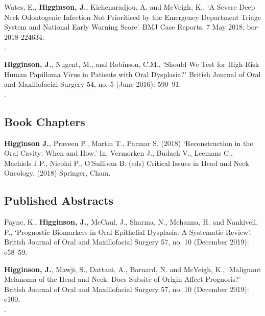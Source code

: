  Wates, E., \textbf{Higginson, J.}, Kichenaradjou, A. and McVeigh, K., `A Severe Deep Neck Odontogenic Infection Not Prioritised by the Emergency Department Triage System and National Early Warning Score’. BMJ Case Reports, 7 May 2018, bcr-2018-224634. 
\\.

\vspace{0.1cm}

 \textbf{Higginson, J.}, Nugent, M., and Robinson, C.M., `Should We Test for High-Risk Human Papilloma Virus in Patients with Oral Dysplasia?’ British Journal of Oral and Maxillofacial Surgery 54, no. 5 (June 2016): 590–91. 
\\.



\subsection*{Book Chapters}

 \textbf{Higginson J.}, Praveen P., Martin T., Parmar S. (2018) `Reconstruction in the Oral Cavity: When and How.' In: Vermorken J., Budach V., Leemans C., Machiels J.P., Nicolai P., O'Sullivan B. (eds) Critical Issues in Head and Neck Oncology. (2018) Springer, Cham. 
\\



\subsection*{Published Abstracts}

 Payne, K., \textbf{Higginson, J.}, McCaul, J., Sharma, N., Mehanna, H. and Nankivell, P., `Prognostic Biomarkers in Oral Epithelial Dysplasia: A Systematic Review’. British Journal of Oral and Maxillofacial Surgery 57, no. 10 (December 2019): e58–59. 
\\

\vspace{0.1cm}

 \textbf{Higginson, J.}, Mawji, S., Dattani, A., Barnard, N. and McVeigh, K., `Malignant Melanoma of the Head and Neck: Does Subsite of Origin Affect Prognosis?’ British Journal of Oral and Maxillofacial Surgery 57, no. 10 (December 2019): e100. 
\\.

